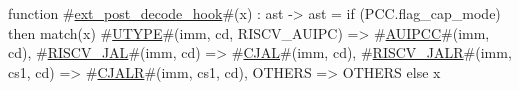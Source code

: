 function #\hyperref[sailRISCVzextzypostzydecodezyhook]{ext\_post\_decode\_hook}#(x) : ast -> ast = {
  if (PCC.flag_cap_mode) then match(x) {
    #\hyperref[sailRISCVzUTYPE]{UTYPE}#(imm, cd, RISCV_AUIPC) => #\hyperref[sailRISCVzAUIPCC]{AUIPCC}#(imm, cd),
    #\hyperref[sailRISCVzRISCVzyJAL]{RISCV\_JAL}#(imm, cd) => #\hyperref[sailRISCVzCJAL]{CJAL}#(imm, cd),
    #\hyperref[sailRISCVzRISCVzyJALR]{RISCV\_JALR}#(imm, cs1, cd) => #\hyperref[sailRISCVzCJALR]{CJALR}#(imm, cs1, cd),
    OTHERS => OTHERS
  } else
    x
}
